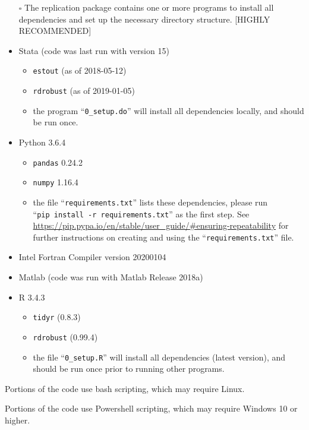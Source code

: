 \documentclass[
]{article}
\providecommand{\tightlist}{%
  \setlength{\itemsep}{0pt}\setlength{\parskip}{0pt}}
\begin{document}
\begin{itemize}
\item[$\square$]
  The replication package contains one or more programs to install all
  dependencies and set up the necessary directory structure. {[}HIGHLY
  RECOMMENDED{]}
\item
  Stata (code was last run with version 15)

  \begin{itemize}
  \tightlist
  \item
    \texttt{estout} (as of 2018-05-12)
  \item
    \texttt{rdrobust} (as of 2019-01-05)
  \item
    the program ``\texttt{0\_setup.do}'' will install all dependencies
    locally, and should be run once.
  \end{itemize}
\item
  Python 3.6.4

  \begin{itemize}
  \tightlist
  \item
    \texttt{pandas} 0.24.2
  \item
    \texttt{numpy} 1.16.4
  \item
    the file ``\texttt{requirements.txt}'' lists these dependencies,
    please run ``\texttt{pip\ install\ -r\ requirements.txt}'' as the
    first step. See
    \url{https://pip.pypa.io/en/stable/user_guide/\#ensuring-repeatability}
    for further instructions on creating and using the
    ``\texttt{requirements.txt}'' file.
  \end{itemize}
\item
  Intel Fortran Compiler version 20200104
\item
  Matlab (code was run with Matlab Release 2018a)
\item
  R 3.4.3

  \begin{itemize}
  \tightlist
  \item
    \texttt{tidyr} (0.8.3)
  \item
    \texttt{rdrobust} (0.99.4)
  \item
    the file ``\texttt{0\_setup.R}'' will install all dependencies
    (latest version), and should be run once prior to running other
    programs.
  \end{itemize}
\end{itemize}

Portions of the code use bash scripting, which may require Linux.

Portions of the code use Powershell scripting, which may require Windows
10 or higher.
\end{document}
